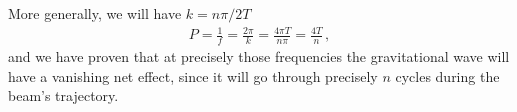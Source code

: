 \documentclass[main.tex]{subfiles}
\begin{document}
More generally, we will have \(k = n \pi /2T\)
%
\begin{align}
P = \frac{1}{f} = \frac{2 \pi }{k} = \frac{4 \pi T}{n \pi } = \frac{4T}{n}
\,,
\end{align}
%
and we have proven that at precisely those frequencies the gravitational wave will have a vanishing net effect, since it will go through precisely \(n\) cycles during the beam's trajectory. 

\end{document}

